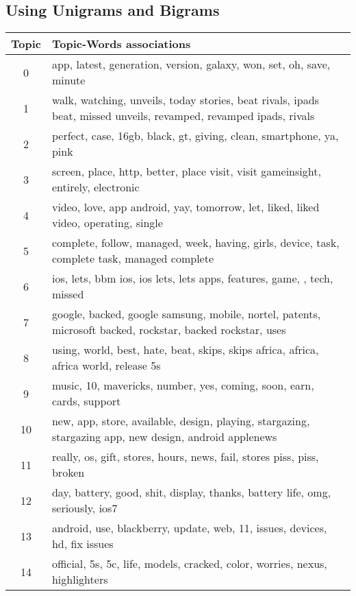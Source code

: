 \subsection{Using Unigrams and Bigrams}
\label{sec:unigrams_bigrams_lda}
\begin{table}
  \begin{tabular}{c p{16cm}} \toprule
    Topic & Topic-Words associations \\ \midrule
    0     & app, latest, generation, version, galaxy, won, set, oh, save, minute \\ \midrule
    1     & walk, watching, unveils, today stories, beat rivals, ipads beat, missed unveils, revamped, revamped ipads, rivals \\ \midrule
    2     & perfect, case, 16gb, black, gt, giving, clean, smartphone, ya, pink \\ \midrule
    3     & screen, place, http, better, place visit, visit gameinsight, entirely, electronic \\ \midrule
    4     & video, love, app android, yay, tomorrow, let, liked, liked video, operating, single \\ \midrule
    5     & complete, follow, managed, week, having, girls, device, task, complete task, managed complete \\ \midrule
    6     & ios, lets, bbm ios, ios lets, lets apps, features, game, , tech, missed \\ \midrule
    7     & google, backed, google samsung, mobile, nortel, patents, microsoft backed, rockstar, backed rockstar, uses \\ \midrule
    8     & using, world, best, hate, beat, skips, skips africa, africa, africa world, release 5s \\ \midrule
    9     & music, 10, mavericks, number, yes, coming, soon, earn, cards, support \\ \midrule
    10    & new, app, store, available, design, playing, stargazing, stargazing app, new design, android applenews \\ \midrule
    11    & really, os, gift, stores, hours, news, fail, stores piss, piss, broken \\ \midrule
    12    & day, battery, good, shit, display, thanks, battery life, omg, seriously, ios7 \\ \midrule
    13    & android, use, blackberry, update, web, 11, issues, devices, hd, fix issues \\ \midrule
    14    & official, 5s, 5c, life, models, cracked, color, worries, nexus, highlighters \\ \midrule

\end{tabular}
\end{table}

